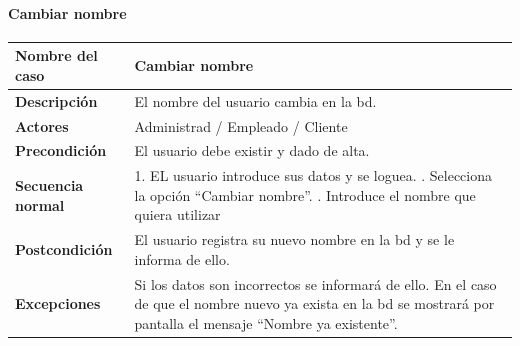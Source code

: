 \paragraph{Cambiar nombre}
\begin{table}[H]
    \centering
    \small
    \begin{tabularx}{0.8\textwidth}{|p{3.5cm}|X|}
        \hline
        \rowcolor{lightgray}
        \textbf{Nombre del caso}  & \textbf{Cambiar nombre}                                                                                                                                                    \\
        \hline
        \textbf{Descripción}      & El nombre del usuario cambia en la \gls{bd}.                                                                                                                               \\
        \hline
        \textbf{Actores}          & Administrad / Empleado / Cliente                                                                                                                                           \\
        \hline
        \textbf{Precondición}     & El usuario debe existir y dado de alta.                                                                                                                                    \\
        \hline
        \textbf{Secuencia normal} & 1. EL usuario introduce sus datos y se loguea. \newline
        2. Selecciona la opción ``Cambiar nombre''. \newline
        3. Introduce el nombre que quiera utilizar                                                                                                                                                             \\
        \hline
        \textbf{Postcondición}    & El usuario registra su nuevo nombre en la \gls{bd} y se le informa de ello.                                                                                                \\
        \hline
        \textbf{Excepciones}      & Si los datos son incorrectos se informará de ello. En el caso de que el nombre nuevo ya exista en la \gls{bd} se mostrará por pantalla el mensaje ``Nombre ya existente''. \\
        \hline
    \end{tabularx}
\end{table}
